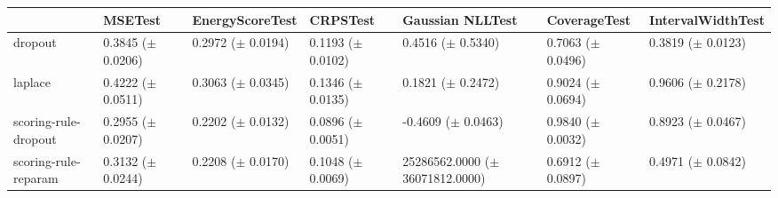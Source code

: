 \begin{tabular}{lllllll}
\toprule
 & MSETest & EnergyScoreTest & CRPSTest & Gaussian NLLTest & CoverageTest & IntervalWidthTest \\
\midrule
dropout & \makecell{0.3845 \\ ($\pm$ 0.0206)} & \makecell{0.2972 \\ ($\pm$ 0.0194)} & \makecell{0.1193 \\ ($\pm$ 0.0102)} & \makecell{0.4516 \\ ($\pm$ 0.5340)} & \makecell{0.7063 \\ ($\pm$ 0.0496)} & \makecell{0.3819 \\ ($\pm$ 0.0123)} \\
laplace & \makecell{0.4222 \\ ($\pm$ 0.0511)} & \makecell{0.3063 \\ ($\pm$ 0.0345)} & \makecell{0.1346 \\ ($\pm$ 0.0135)} & \makecell{0.1821 \\ ($\pm$ 0.2472)} & \makecell{0.9024 \\ ($\pm$ 0.0694)} & \makecell{0.9606 \\ ($\pm$ 0.2178)} \\
scoring-rule-dropout & \makecell{0.2955 \\ ($\pm$ 0.0207)} & \makecell{0.2202 \\ ($\pm$ 0.0132)} & \makecell{0.0896 \\ ($\pm$ 0.0051)} & \makecell{-0.4609 \\ ($\pm$ 0.0463)} & \makecell{0.9840 \\ ($\pm$ 0.0032)} & \makecell{0.8923 \\ ($\pm$ 0.0467)} \\
scoring-rule-reparam & \makecell{0.3132 \\ ($\pm$ 0.0244)} & \makecell{0.2208 \\ ($\pm$ 0.0170)} & \makecell{0.1048 \\ ($\pm$ 0.0069)} & \makecell{25286562.0000 \\ ($\pm$ 36071812.0000)} & \makecell{0.6912 \\ ($\pm$ 0.0897)} & \makecell{0.4971 \\ ($\pm$ 0.0842)} \\
\bottomrule
\end{tabular}
